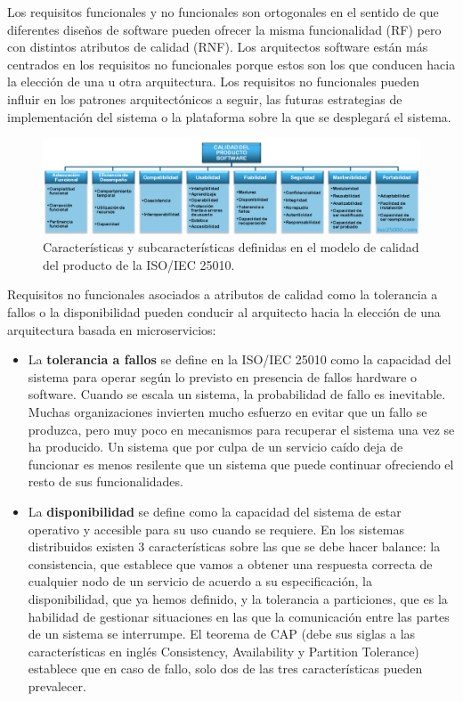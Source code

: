 \documentclass[11pt,spanish,listoffigures,listoftables]{tfgetsinf}
\begin{document}
Los requisitos funcionales y no funcionales son ortogonales en el sentido de que diferentes diseños de software pueden ofrecer la misma funcionalidad (RF) pero con distintos atributos de calidad (RNF). Los arquitectos software están más centrados en los requisitos no funcionales porque estos son los que conducen hacia la elección de una u otra arquitectura. Los requisitos no funcionales pueden influir en los patrones arquitectónicos a seguir, las futuras estrategias de implementación del sistema o la plataforma sobre la que se desplegará el sistema. \cite{Ameller2013}

\begin{figure}[h]
\centering
\includegraphics[scale=0.5]{iso25010}
\caption{Características y subcaracterísticas definidas en el modelo de calidad del producto de la ISO/IEC 25010. \cite{Standard2010}}
\end{figure}

Requisitos no funcionales asociados a atributos de calidad como la tolerancia a fallos o la disponibilidad pueden conducir al arquitecto hacia la elección de una arquitectura basada en microservicios:

\begin{itemize}

\item La \textbf{tolerancia a fallos} se define en la ISO/IEC 25010 como la capacidad del sistema para operar según lo previsto en presencia de fallos hardware o software. \cite{Standard2010} Cuando se escala un sistema, la probabilidad de fallo es inevitable. Muchas organizaciones invierten mucho esfuerzo en evitar que un fallo se produzca, pero muy poco en mecanismos para recuperar el sistema una vez se ha producido. Un sistema que por culpa de un servicio caído deja de funcionar es menos resilente que un sistema que puede continuar ofreciendo el resto de sus funcionalidades.

\item La \textbf{disponibilidad} se define como la capacidad del sistema de estar operativo y accesible para su uso cuando se requiere. \cite{Standard2010} En los sistemas distribuidos existen 3 características sobre las que se debe hacer balance: la consistencia, que establece que vamos a obtener una respuesta correcta de cualquier nodo de un servicio de acuerdo a su especificación, la disponibilidad, que ya hemos definido, y la tolerancia a particiones, que es la habilidad de gestionar situaciones en las que la comunicación entre las partes de un sistema se interrumpe. El teorema de CAP (debe sus siglas a las características en inglés Consistency, Availability y Partition Tolerance) establece que en caso de fallo, solo dos de las tres características pueden prevalecer. \cite{Gilbert2012}

\end{itemize}
\end{document}
